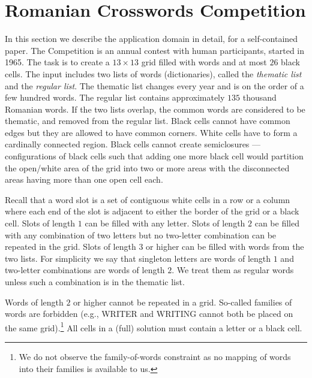 \section{Romanian Crosswords Competition}
\label{sec::roco}


In this section we describe the application domain in detail,
for a self-contained paper.
The Competition is an annual contest with human participants, started in 1965.
The task is to create a $13\times13$ grid filled with words and
at most $26$ black cells.
The input includes two lists of words (dictionaries), called the \emph{thematic list}
and the \emph{regular list}.
The thematic list changes every year and is on the order of a few hundred words.
The regular list contains approximately $135$ thousand Romanian words.
If the two lists overlap, the common words 
are considered to be thematic, and removed from the regular list.
Black cells cannot have common edges but they are allowed to have common corners. 
White cells have to form a cardinally connected region. Black cells cannot create semiclosures --- configurations of black cells such that
adding one more black cell would partition the open/white area of the grid into two or more
areas with the disconnected areas having more than one open cell each.

Recall that a {word slot}
is a set of contiguous white cells in a row or a column
where each end of the slot is adjacent to either the 
border of the grid or a black cell.
%
Slots of length $1$ can be filled with any letter.
Slots of length $2$ can be filled with any combination of two letters
but no two-letter combination can be repeated in the grid.
Slots of length $3$ or higher can be filled with words from the two lists.
For simplicity we say that singleton letters are words
of length $1$ and two-letter combinations are words of length $2$.
We treat them as regular words unless such a combination is in the thematic list.%

Words of length $2$ or higher cannot be repeated in a grid.
So-called families of words are forbidden (e.g., 
{\sf\small WRITER} and {\sf\small WRITING} cannot both be placed on the same grid).\footnote{We do not observe the family-of-words constraint as no mapping of words into their families is available to us.}
All cells in a (full) solution must contain a letter or a black cell.

